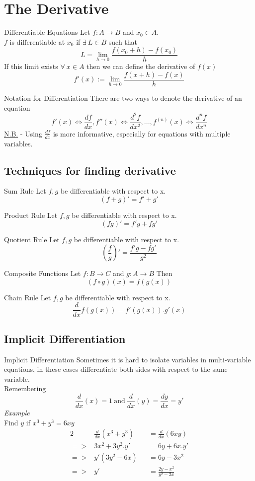 \documentclass[11pt,a4paper]{article}
\begin{document}
\section{The Derivative}

\subtitle{Definition 3.01 - }{Differentiable Equations}
Let $f : A \to B$ and $x_0 \in A$. \\
$f$ is differentiable at $x_0$ if $\exists\ L \in B$ such that $$L = \lim_{h \to 0} \frac{f(x_0 + h)-f(x_0)}{h}$$
If this limit exists $\forall\ x \in A$ then we can define the derivative of $f(x)$ $$f'(x) := \lim_{h \to 0} \frac{f(x + h) -f(x)}{h}$$

\subtitle{Definition 3.02 - }{Notation for Differentiation}
There are two ways to denote the derivative of an equation $$f'(x) \iff \frac{df}{dx}, f''(x) \iff \frac{d^2f}{dx^2}, ... , f^{(n)}(x) \iff \frac{d^nf}{dx^n}$$
\underline{N.B.} - Using $\displaystyle{\frac{df}{dx}}$ is more informative, especially for equations with multiple variables.

\subsection{Techniques for finding derivative}
%
\subtitle{Theorem 3.03 - }{Sum Rule}
Let $f, g$ be differentiable with respect to x.
$$(f+g)' = f' + g'$$

\subtitle{Theorem 3.04 - }{Product Rule}
Let $f, g$ be differentiable with respect to x.
$$(fg)' = f'g + fg'$$

\subtitle{Theorem 3.05 - }{Quotient Rule}
Let $f, g$ be differentiable with respect to x.
$$\left(\frac{f}{g}\right)' = \frac{f'g - fg'}{g^2}$$

\subtitle{Definition 3.06 - }{Composite Functions}
Let $f : B \to C$ and $g : A \to B$ Then $$(f \circ g)(x) = f(g(x))$$

\subtitle{Theorem 3.07 - }{Chain Rule}
Let $f, g$ be differentiable with respect to x.
$$\frac{d}{dx} f(g(x)) = f'(g(x)).g'(x)$$

\subsection{Implicit Differentiation}
%
\subtitle{Definition 3.08 - }{Implicit Differentiation}
Sometimes it is hard to isolate variables in multi-variable equations, in these cases differentiate both sides with respect to the same variable. \\
Remembering $$\frac{d}{dx}(x) = 1\ \mathrm{and}\ \frac{d}{dx}(y) = \frac{dy}{dx} = y'$$
\textit{Example} \\
Find $y$ if $x^3 + y^3 = 6xy$
\begin{alignat*}{2}
  &\frac{d}{dx}\left(x^3 + y^3\right) &&= \frac{d}{dx}\left(6xy\right) \\
  => &3x^2 + 3y^2.y' &&= 6y + 6x.y' \\
  => &y'(3y^2 - 6x) &&= 6y - 3x^2 \\
  => &y' &&= \frac{2y - x^2}{y^2 - 2x}
\end{alignat*}
\end{document}
